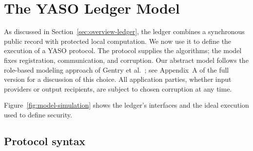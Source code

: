\section{The YASO Ledger Model}
\label{sec:ledger}

As discussed in Section~\ref{sec:overview-ledger}, the ledger combines a
synchronous public record with protected local computation.  We now use
it to define the execution of a YASO protocol.  The protocol supplies the
algorithms; the model fixes registration, communication, and corruption.
Our abstract model follows the role-based modeling approach of
Gentry et al.~\cite{GentryEtAl2021YOSOFull}; see Appendix~A of the full
version for a discussion of this choice.
All application parties, whether input providers or output recipients,
are subject to chosen corruption at any time.

Figure~\ref{fig:model-simulation} shows the ledger's interfaces and the
ideal execution used to define security.

\subsection{Protocol syntax}
\label{sec:yaso-syntax}

